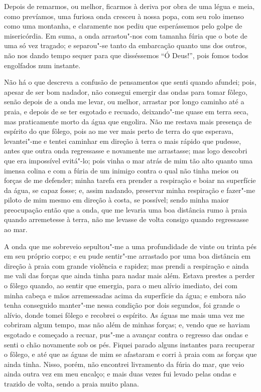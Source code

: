 Depois de remarmos, ou melhor, ficarmos à deriva por obra de uma légua e
meia, como prevíamos, uma furiosa onda cresceu à nossa popa, com seu
rolo imenso como uma montanha, e claramente nos pediu que esperássemos
pelo golpe de misericórdia. Em suma, a onda arrastou"-nos com tamanha
fúria que o bote de uma só vez tragado; e separou"-se tanto da embarcação
quanto uns dos outros, não nos dando tempo sequer para que disséssemos
``Ó Deus!'', pois fomos todos engolfados num instante.

Não há o que descreva a confusão de pensamentos que senti quando
afundei; pois, apesar de ser bom nadador, não consegui emergir das ondas
para tomar fôlego, senão depois de a onda me levar, ou melhor, arrastar
por longo caminho até a praia, e depois de se ter esgotado e recuado,
deixando"-me quase em terra seca, mas praticamente morto da água que
engolira. Não me restava mais presença de espírito do que fôlego, pois
ao me ver mais perto de terra do que esperava, levantei"-me e tentei
caminhar em direção à terra o mais rápido que pudesse, antes que outra
onda regressasse e novamente me arrastasse; mas logo descobri que era
impossível evitá"-lo; pois vinha o mar atrás de mim tão alto quanto uma
imensa colina e com a fúria de um inimigo contra o qual não tinha meios
ou forças de me defender; minha tarefa era prender a respiração e boiar
na superfície da água, se capaz fosse; e, assim nadando, preservar minha
respiração e fazer"-me piloto de mim mesmo em direção à costa, se
possível; sendo minha maior preocupação então que a onda, que me levaria
uma boa distância rumo à praia quando arremetesse à terra, não me
levasse de volta consigo quando regressasse ao mar.

A onda que me sobreveio sepultou"-me a uma profundidade de vinte ou
trinta pés em seu próprio corpo; e eu pude sentir"-me arrastado por uma
boa distância em direção à praia com grande violência e rapidez; mas
prendi a respiração e ainda me vali das forças que ainda tinha para
nadar mais além. Estava prestes a perder o fôlego quando, ao sentir que
emergia, para o meu alívio imediato, dei com minha cabeça e mãos
arremessadas acima da superfície da água; e embora não tenha conseguido
manter"-me nessa condição por dois segundos, foi grande o alívio, donde
tomei fôlego e recobrei o espírito. As águas me mais uma vez me cobriram
algum tempo, mas não além de minhas forças; e, vendo que se haviam
esgotado e começado a recuar, pus"-me a avançar contra o regresso das
ondas e senti o chão novamente sob os pés. Fiquei parado alguns
instantes para recuperar o fôlego, e até que as águas de mim se
afastaram e corri à praia com as forças que ainda tinha. Nisso, porém,
não encontrei livramento da fúria do mar, que veio ainda outra vez em
meu encalço; e mais duas vezes fui levado pelas ondas e trazido de
volta, sendo a praia muito plana.

